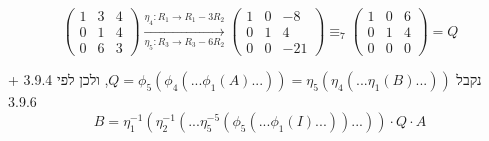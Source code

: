\documentclass{article}
\begin{document}
\[
    \begin{pmatrix}
        1 & 3 & 4 \\
        0 & 1 & 4 \\
        0 & 6 & 3
    \end{pmatrix}
    \xrightarrow[\eta_5: R_3\rightarrow R_3-6R_2]{\eta_4: R_1\rightarrow R_1-3R_2}
    \begin{pmatrix}
        1 & 0 & -8  \\
        0 & 1 & 4   \\
        0 & 0 & -21
    \end{pmatrix}
    \equiv_7
    \begin{pmatrix}
        1 & 0 & 6 \\
        0 & 1 & 4 \\
        0 & 0 & 0
    \end{pmatrix} = Q
\]

נקבל $Q=\phi_5(\phi_4(...\phi_1(A)...))=\eta_5(\eta_4(...\eta_1(B)...))$,
ולכן לפי 3.9.4 + 3.9.6
\[
    B = \eta^{-1}_1(\eta^{-1}_2(...\eta^{-5}_5(\phi_5(...\phi_1(I)...))...)) \cdot Q \cdot A
\]
\end{document}
